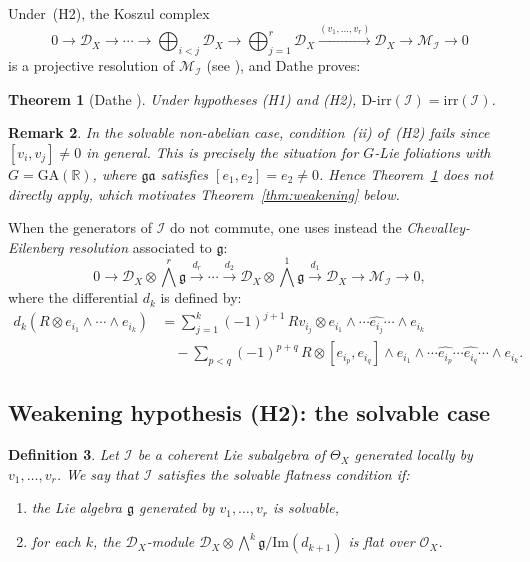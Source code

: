 \documentclass[12pt,a4paper]{article}
\newtheorem{theorem}{Theorem}[section]
\newtheorem{definition}[theorem]{Definition}
\newtheorem{remark}[theorem]{Remark}
\begin{document}
Under~(H2), the Koszul complex
\[
0 \to \mathcal{D}_X \to \cdots \to
\bigoplus_{i<j}\mathcal{D}_X \to
\bigoplus_{j=1}^r \mathcal{D}_X
\xrightarrow{(v_1,\ldots,v_r)} \mathcal{D}_X \to
\mathcal{M}_{\mathcal{I}} \to 0
\]
is a projective resolution of $\mathcal{M}_{\mathcal{I}}$
(see \cite[Prop.~3.3]{D16}), and Dathe proves:

\begin{theorem}[Dathe \cite{D16}]\label{thm:dathe}
Under hypotheses \emph{(H1)} and \emph{(H2)},
$\mathrm{D\text{-}irr}(\mathcal{I}) = \mathrm{irr}(\mathcal{I})$.
\end{theorem}

\begin{remark}
In the solvable non-abelian case, condition~(ii) of~(H2) fails since
$[v_i,v_j] \neq 0$ in general. This is precisely the situation for
$G$-Lie foliations with $G = \mathrm{GA}(\mathbb{R})$, where
$\mathfrak{ga}$ satisfies $[e_1,e_2]=e_2 \neq 0$. Hence
Theorem~\ref{thm:dathe} does not directly apply, which motivates
Theorem~\ref{thm:weakening} below.
\end{remark}

When the generators of $\mathcal{I}$ do not commute, one uses instead the
\emph{Chevalley-Eilenberg resolution} associated to $\mathfrak{g}$:
\[
0 \to \mathcal{D}_X \otimes \bigwedge^r\mathfrak{g}
\xrightarrow{d_r} \cdots
\xrightarrow{d_2} \mathcal{D}_X \otimes \bigwedge^1\mathfrak{g}
\xrightarrow{d_1} \mathcal{D}_X
\to \mathcal{M}_{\mathcal{I}} \to 0,
\]
where the differential $d_k$ is defined by:
\begin{align*}
d_k(R \otimes e_{i_1} \wedge \cdots \wedge e_{i_k})
&= \sum_{j=1}^k (-1)^{j+1}\, R v_{i_j}
   \otimes e_{i_1} \wedge \cdots \widehat{e_{i_j}} \cdots \wedge e_{i_k} \\
&\quad - \sum_{p < q} (-1)^{p+q}\, R
   \otimes [e_{i_p}, e_{i_q}]
   \wedge e_{i_1} \wedge \cdots \widehat{e_{i_p}}
   \cdots \widehat{e_{i_q}} \cdots \wedge e_{i_k}.
\end{align*}

\subsection{Weakening hypothesis (H2): the solvable case}

\begin{definition}\label{def:flat}
Let $\mathcal{I}$ be a coherent Lie subalgebra of $\Theta_X$ generated
locally by $v_1,\ldots,v_r$. We say that $\mathcal{I}$ satisfies the
\emph{solvable flatness condition} if:
\begin{enumerate}[label=(\roman*)]
\item the Lie algebra $\mathfrak{g}$ generated by $v_1,\ldots,v_r$ is
solvable,
\item for each $k$, the $\mathcal{D}_X$-module
$\mathcal{D}_X \otimes \bigwedge^k\mathfrak{g} \big/ \mathrm{Im}(d_{k+1})$
is flat over $\mathcal{O}_X$.
\end{enumerate}
\end{definition}
\end{document}
